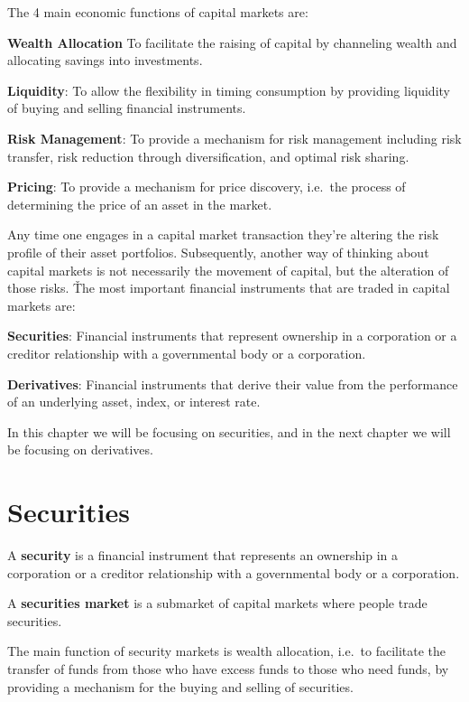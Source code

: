 The 4 main economic functions of capital markets are:
\bit
\item \textbf{Wealth Allocation} To facilitate the raising of capital by channeling wealth and allocating savings into
investments.
\item \textbf{Liquidity}: To allow the flexibility in timing consumption by providing liquidity of buying and selling
financial instruments.
\item \textbf{Risk Management}: To provide a mechanism for risk management including risk transfer, risk reduction
through diversification, and optimal risk sharing.
\item \textbf{Pricing}: To provide a mechanism for price discovery, i.e.\ the process of determining the price of an
asset in the market.
\eit

Any time one engages in a capital market transaction they're altering the risk profile of their asset portfolios.
Subsequently, another way of thinking about capital markets is not necessarily the movement of capital, but the
alteration of those risks. \v

The most important financial instruments that are traded in capital markets are:
\bit
\item \textbf{Securities}: Financial instruments that represent ownership in a corporation or a creditor relationship
with a governmental body or a corporation.
\item \textbf{Derivatives}: Financial instruments that derive their value from the performance of an underlying asset,
index, or interest rate.
\eit

In this chapter we will be focusing on securities, and in the next chapter we will be focusing on derivatives.

\section{Securities}

\bd[Security]
A \textbf{security} is a financial instrument that represents an ownership in a corporation or a creditor relationship
with a governmental body or a corporation.
\ed

A \textbf{securities market} is a submarket of capital markets where people trade securities.
\ed

The main function of security markets is wealth allocation, i.e.\ to facilitate the transfer of funds from those who
have excess funds to those who need funds, by providing a mechanism for the buying and selling of securities.


